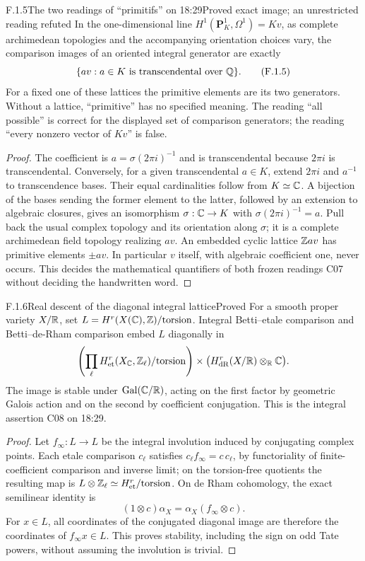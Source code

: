 \begin{result}{F.1.5}{The two readings of ``primitifs'' on 18:29}{Proved exact image; an unrestricted reading refuted}
In the one-dimensional line $H^1(\mathbf P^1_K,\Omega^1)=Kv$, as complete archimedean topologies and the accompanying orientation choices vary, the comparison images of an oriented integral generator are exactly
\[
 \{a v:a\in K\text{ is transcendental over }\mathbb Q\}.
 \tag{F.1.5}
\]
For a fixed one of these lattices the primitive elements are its two generators. Without a lattice, ``primitive'' has no specified meaning. The reading ``all possible'' is correct for the displayed set of comparison generators; the reading ``every nonzero vector of $Kv$'' is false.
\end{result}
\begin{proof}
The coefficient is $a=\sigma(2\pi i)^{-1}$ and is transcendental because $2\pi i$ is transcendental. Conversely, for a given transcendental $a\in K$, extend $2\pi i$ and $a^{-1}$ to transcendence bases. Their equal cardinalities follow from $K\simeq\mathbb C$. A bijection of the bases sending the former element to the latter, followed by an extension to algebraic closures, gives an isomorphism $\sigma:\mathbb C\to K$ with $\sigma(2\pi i)^{-1}=a$. Pull back the usual complex topology and its orientation along $\sigma$; it is a complete archimedean field topology realizing $av$. An embedded cyclic lattice $\mathbb Z av$ has primitive elements $\pm av$. In particular $v$ itself, with algebraic coefficient one, never occurs. This decides the mathematical quantifiers of both frozen readings C07 without deciding the handwritten word.
\end{proof}

\begin{result}{F.1.6}{Real descent of the diagonal integral lattice}{Proved}
For a smooth proper variety $X/\mathbb R$, set $L=H^r(X(\mathbb C),\mathbb Z)/\mathrm{torsion}$. Integral Betti--etale comparison and Betti--de-Rham comparison embed $L$ diagonally in
\[
 \left(\prod_\ell H^r_{\mathrm{et}}(X_\mathbb C,\mathbb Z_\ell)/\mathrm{torsion}\right)
 \times \bigl(H^r_{\mathrm{dR}}(X/\mathbb R)\otimes_\mathbb R\mathbb C\bigr).
\]
The image is stable under $\operatorname{Gal}(\mathbb C/\mathbb R)$, acting on the first factor by geometric Galois action and on the second by coefficient conjugation. This is the integral assertion C08 on 18:29.
\end{result}
\begin{proof}
Let $f_\infty:L\to L$ be the integral involution induced by conjugating complex points. Each etale comparison $c_\ell$ satisfies $c_\ell f_\infty=c\,c_\ell$, by functoriality of finite-coefficient comparison and inverse limit; on the torsion-free quotients the resulting map is $L\otimes\mathbb Z_\ell\simeq H^r_{\mathrm{et}}/\mathrm{torsion}$. On de Rham cohomology, the exact semilinear identity is
\[
 (1\otimes c)\alpha_X=\alpha_X(f_\infty\otimes c).
\]
For $x\in L$, all coordinates of the conjugated diagonal image are therefore the coordinates of $f_\infty x\in L$. This proves stability, including the sign on odd Tate powers, without assuming the involution is trivial.
\end{proof}

